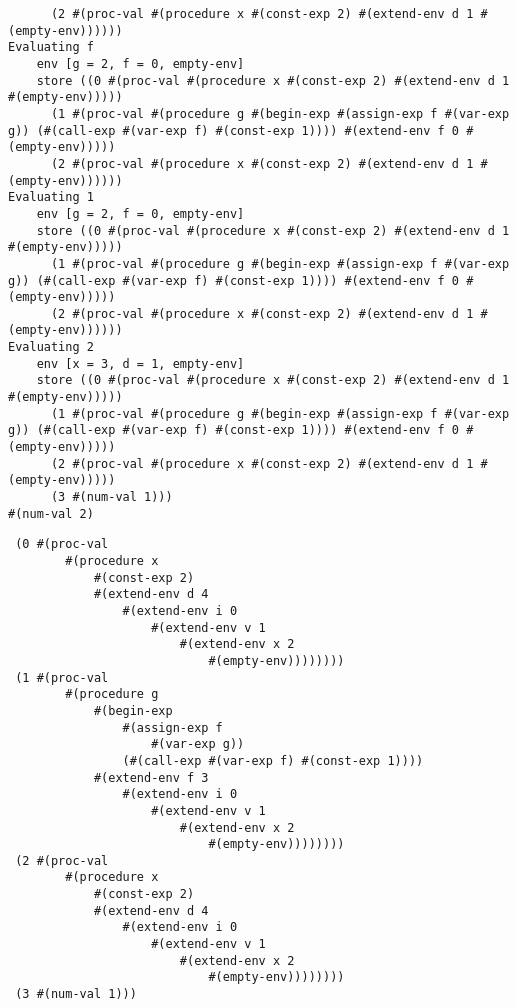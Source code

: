 \documentclass[../main.tex]{subfiles}
\begin{document}
\begin{lstlisting}
      (2 #(proc-val #(procedure x #(const-exp 2) #(extend-env d 1 #(empty-env))))))
Evaluating f
    env [g = 2, f = 0, empty-env]
    store ((0 #(proc-val #(procedure x #(const-exp 2) #(extend-env d 1 #(empty-env)))))
      (1 #(proc-val #(procedure g #(begin-exp #(assign-exp f #(var-exp g)) (#(call-exp #(var-exp f) #(const-exp 1)))) #(extend-env f 0 #(empty-env)))))
      (2 #(proc-val #(procedure x #(const-exp 2) #(extend-env d 1 #(empty-env))))))
Evaluating 1
    env [g = 2, f = 0, empty-env]
    store ((0 #(proc-val #(procedure x #(const-exp 2) #(extend-env d 1 #(empty-env)))))
      (1 #(proc-val #(procedure g #(begin-exp #(assign-exp f #(var-exp g)) (#(call-exp #(var-exp f) #(const-exp 1)))) #(extend-env f 0 #(empty-env)))))
      (2 #(proc-val #(procedure x #(const-exp 2) #(extend-env d 1 #(empty-env))))))
Evaluating 2
    env [x = 3, d = 1, empty-env]
    store ((0 #(proc-val #(procedure x #(const-exp 2) #(extend-env d 1 #(empty-env)))))
      (1 #(proc-val #(procedure g #(begin-exp #(assign-exp f #(var-exp g)) (#(call-exp #(var-exp f) #(const-exp 1)))) #(extend-env f 0 #(empty-env)))))
      (2 #(proc-val #(procedure x #(const-exp 2) #(extend-env d 1 #(empty-env)))))
      (3 #(num-val 1)))
#(num-val 2)
\end{lstlisting}

\begin{lstlisting}
 (0 #(proc-val
        #(procedure x
            #(const-exp 2)
            #(extend-env d 4
                #(extend-env i 0
                    #(extend-env v 1
                        #(extend-env x 2
                            #(empty-env))))))))
 (1 #(proc-val
        #(procedure g
            #(begin-exp
                #(assign-exp f
                    #(var-exp g))
                (#(call-exp #(var-exp f) #(const-exp 1))))
            #(extend-env f 3
                #(extend-env i 0
                    #(extend-env v 1
                        #(extend-env x 2
                            #(empty-env))))))))
 (2 #(proc-val
        #(procedure x
            #(const-exp 2)
            #(extend-env d 4
                #(extend-env i 0
                    #(extend-env v 1
                        #(extend-env x 2
                            #(empty-env))))))))
 (3 #(num-val 1)))
\end{lstlisting}
\end{document}
